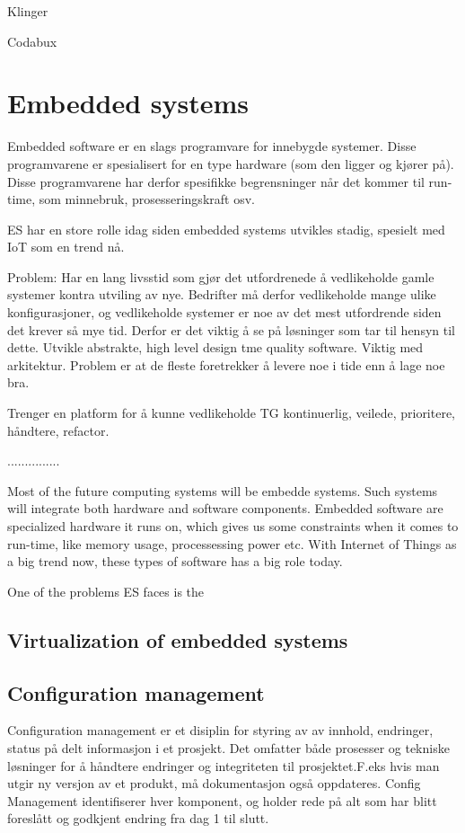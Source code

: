 Klinger

Codabux


\section{Embedded systems}
Embedded software er en slags programvare for innebygde systemer. Disse programvarene er spesialisert for en type hardware (som den ligger og kjører på). Disse programvarene har derfor spesifikke begrensninger når det kommer til run-time, som minnebruk, prosesseringskraft osv.

ES har en store rolle idag siden embedded systems utvikles stadig, spesielt med IoT som en trend nå.

Problem: Har en lang livsstid som gjør det utfordrenede å vedlikeholde gamle systemer kontra utviling av nye. Bedrifter må derfor vedlikeholde mange ulike konfigurasjoner, og vedlikeholde systemer er noe av det mest utfordrende siden det krever så mye tid. Derfor er det viktig å se på løsninger som tar til hensyn til dette. Utvikle abstrakte, high level design tme quality software. Viktig med arkitektur. Problem er at de fleste foretrekker å levere noe i tide enn å lage noe bra.

Trenger en platform for å kunne vedlikeholde TG kontinuerlig, veilede, prioritere, håndtere, refactor.


...............

Most of the future computing systems will be embedde systems. Such systems will integrate both hardware and software components\cite{wolfmadsen-2000}. Embedded software are specialized hardware it runs on, which gives us some constraints when it comes to run-time, like memory usage, processessing power etc. With Internet of Things as a big trend now, these types of software has a big role today. 

One of the problems ES faces is the 

\subsection{Virtualization of embedded systems}


\subsection{Configuration management}
Configuration management er et disiplin for styring av av innhold, endringer, status på delt informasjon i et prosjekt. Det omfatter både prosesser og tekniske løsninger for å håndtere endringer og integriteten til prosjektet.F.eks hvis man utgir ny versjon av et produkt, må dokumentasjon også oppdateres. Config Management identifiserer hver komponent, og holder rede på alt som har blitt foreslått og godkjent endring fra dag 1 til slutt.

